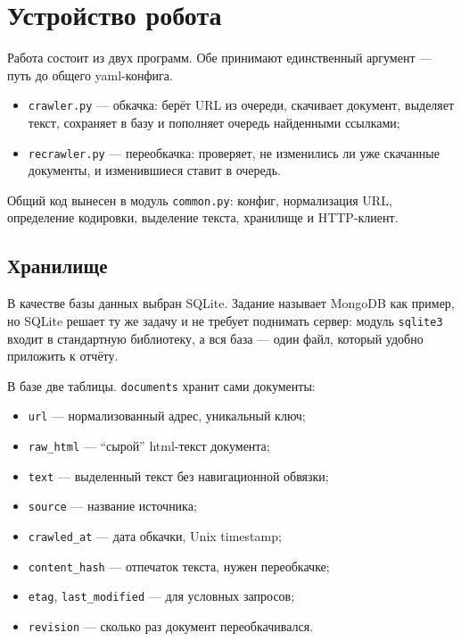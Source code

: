 \section{Устройство робота}

Работа состоит из двух программ. Обе принимают единственный аргумент --- путь до
общего yaml-конфига.

\begin{itemize}
    \item \texttt{crawler.py} --- обкачка: берёт URL из очереди, скачивает
          документ, выделяет текст, сохраняет в базу и пополняет очередь
          найденными ссылками;
    \item \texttt{recrawler.py} --- переобкачка: проверяет, не изменились ли уже
          скачанные документы, и изменившиеся ставит в очередь.
\end{itemize}

Общий код вынесен в модуль \texttt{common.py}: конфиг, нормализация URL,
определение кодировки, выделение текста, хранилище и HTTP-клиент.

\subsection*{Хранилище}

В качестве базы данных выбран SQLite. Задание называет MongoDB как пример, но
SQLite решает ту же задачу и не требует поднимать сервер: модуль
\texttt{sqlite3} входит в стандартную библиотеку, а вся база --- один файл,
который удобно приложить к отчёту.

В базе две таблицы. \texttt{documents} хранит сами документы:

\begin{itemize}
    \item \texttt{url} --- нормализованный адрес, уникальный ключ;
    \item \texttt{raw\_html} --- \enquote{сырой} html-текст документа;
    \item \texttt{text} --- выделенный текст без навигационной обвязки;
    \item \texttt{source} --- название источника;
    \item \texttt{crawled\_at} --- дата обкачки, Unix timestamp;
    \item \texttt{content\_hash} --- отпечаток текста, нужен переобкачке;
    \item \texttt{etag}, \texttt{last\_modified} --- для условных запросов;
    \item \texttt{revision} --- сколько раз документ переобкачивался.
\end{itemize}

